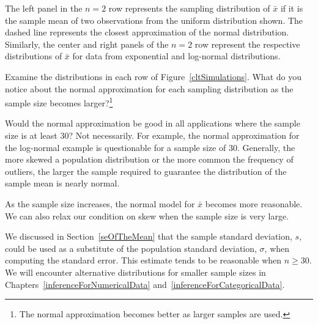 The left panel in the $n=2$ row represents the sampling distribution of $\bar{x}$ if it is the sample mean of two observations from the uniform distribution shown. The dashed line represents the closest approximation of the normal distribution. Similarly, the center and right panels of the $n=2$ row represent the respective distributions of $\bar{x}$ for data from exponential and log-normal distributions.

\begin{exercise}
Examine the distributions in each row of Figure~\ref{cltSimulations}. What do you notice about the normal approximation for each sampling distribution as the sample size becomes larger?\footnote{The normal approximation becomes better as larger samples are used.}
\end{exercise}

\begin{example}{Would the normal approximation be good in all applications where the sample size is at least 30?}
Not necessarily. For example, the normal approximation for the log-normal example is questionable for a sample size of 30. Generally, the more skewed a population distribution or the more common the frequency of outliers, the larger the sample required to guarantee the distribution of the sample mean is nearly normal.
\end{example}

\begin{tipBox}{
As the sample size increases, the normal model for $\bar{x}$ becomes more reasonable. We can also relax our condition on skew when the sample size is very large.}
\end{tipBox}

We discussed in Section~\ref{seOfTheMean} that the sample standard deviation, $s$, could be used as a substitute of the population standard deviation, $\sigma$, when computing the standard error. This estimate tends to be reasonable when $n\geq30$. We will encounter alternative distributions for smaller sample sizes in Chapters~\ref{inferenceForNumericalData} and~\ref{inferenceForCategoricalData}.



